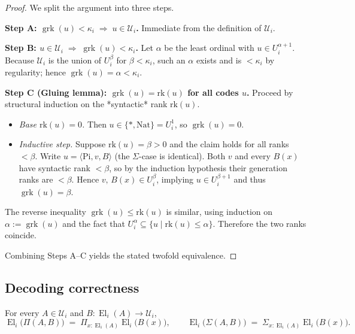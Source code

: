 \documentclass[a4paper,11pt]{article}
\newcommand{\El}{\operatorname{El}}          %
\begin{document}
\begin{proof}
We split the argument into three steps.

\medskip
\textbf{Step A:  $\operatorname{grk}(u)<\kappa_i \;\Rightarrow\; u\in\mathcal U_i$.}  
Immediate from the definition of $\mathcal U_i$.

\medskip
\textbf{Step B:  $u\in\mathcal U_i \;\Rightarrow\; \operatorname{grk}(u)<\kappa_i$.}  
Let $\alpha$ be the least ordinal with $u\in U_i^{\alpha+1}$.
Because $\mathcal U_i$ is the union of $U_i^{\beta}$ for
$\beta<\kappa_i$, such an $\alpha$ exists and is $<\kappa_i$ by
regularity; hence $\operatorname{grk}(u)=\alpha<\kappa_i$.

\medskip
\textbf{Step C (Gluing lemma):  
$\operatorname{grk}(u)=\mathrm{rk}(u)$ for all codes $u$.}  
Proceed by structural induction on the *syntactic* rank
$\mathrm{rk}(u)$.

\begin{itemize}[leftmargin=1.4em,itemsep=0.3em]
\item \emph{Base $\mathrm{rk}(u)=0$.}  
      Then $u\in\{\ast,\mathrm{Nat}\}=U_i^{1}$, so
      $\operatorname{grk}(u)=0$.

\item \emph{Inductive step.}  
      Suppose $\mathrm{rk}(u)=\beta>0$ and the claim holds for all
      ranks $<\beta$.  Write $u=\langle\mathrm{Pi},v,B\rangle$
      (the $\Sigma$-case is identical).  
      Both $v$ and every $B(x)$ have syntactic rank $<\beta$, so by
      the induction hypothesis their generation ranks are
      $<\beta$.  Hence $v,\,B(x)\in U_i^{\beta}$, implying
      $u\in U_i^{\beta+1}$ and thus $\operatorname{grk}(u)=\beta$.
\end{itemize}

The reverse inequality
$\operatorname{grk}(u)\le\mathrm{rk}(u)$ is similar, using induction
on $\alpha:=\operatorname{grk}(u)$ and the fact that
$U_i^{\alpha}\subseteq\{u\mid \mathrm{rk}(u)\le\alpha\}$.
Therefore the two ranks coincide.

\medskip
Combining Steps A–C yields the stated twofold equivalence.
\end{proof}


\subsection{Decoding correctness}
\begin{lemma}\label{lem:decode}
For every $A\in\mathcal U_{i}$ and
$B\colon\El_{i}(A)\to\mathcal U_{i}$,
\[
  \El_{i}\!\bigl(\Pi(A,B)\bigr)
    \;=\;
    \Pi_{x:\El_{i}(A)}\El_{i}\!\bigl(B(x)\bigr),
  \qquad
  \El_{i}\!\bigl(\Sigma(A,B)\bigr)
    \;=\;
    \Sigma_{x:\El_{i}(A)}\El_{i}\!\bigl(B(x)\bigr).
\]
\end{lemma}
\end{document}
